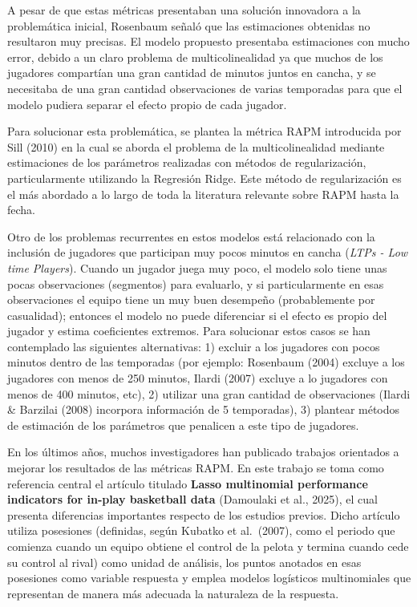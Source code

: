 \documentclass[
  12pt,
]{article}
\begin{document}
A pesar de que estas métricas presentaban una solución innovadora a la
problemática inicial, Rosenbaum señaló que las estimaciones obtenidas no
resultaron muy precisas. El modelo propuesto presentaba estimaciones con
mucho error, debido a un claro problema de multicolinealidad ya que
muchos de los jugadores compartían una gran cantidad de minutos juntos
en cancha, y se necesitaba de una gran cantidad observaciones de varias
temporadas para que el modelo pudiera separar el efecto propio de cada
jugador.

Para solucionar esta problemática, se plantea la métrica RAPM
introducida por Sill (2010) en la cual se aborda el problema de la
multicolinealidad mediante estimaciones de los parámetros realizadas con
métodos de regularización, particularmente utilizando la Regresión
Ridge. Este método de regularización es el más abordado a lo largo de
toda la literatura relevante sobre RAPM hasta la fecha.

Otro de los problemas recurrentes en estos modelos está relacionado con
la inclusión de jugadores que participan muy pocos minutos en cancha
(\emph{LTPs - Low time Players}). Cuando un jugador juega muy poco, el
modelo solo tiene unas pocas observaciones (segmentos) para evaluarlo, y
si particularmente en esas observaciones el equipo tiene un muy buen
desempeño (probablemente por casualidad); entonces el modelo no puede
diferenciar si el efecto es propio del jugador y estima coeficientes
extremos. Para solucionar estos casos se han contemplado las siguientes
alternativas: 1) excluir a los jugadores con pocos minutos dentro de las
temporadas (por ejemplo: Rosenbaum (2004) excluye a los jugadores con
menos de 250 minutos, Ilardi (2007) excluye a lo jugadores con menos de
400 minutos, etc), 2) utilizar una gran cantidad de observaciones
(Ilardi \& Barzilai (2008) incorpora información de 5 temporadas), 3)
plantear métodos de estimación de los parámetros que penalicen a este
tipo de jugadores.

En los últimos años, muchos investigadores han publicado trabajos
orientados a mejorar los resultados de las métricas RAPM. En este
trabajo se toma como referencia central el artículo titulado
\textbf{Lasso multinomial performance indicators for in‑play basketball
data} (Damoulaki et al., 2025), el cual presenta diferencias importantes
respecto de los estudios previos. Dicho artículo utiliza posesiones
(definidas, según Kubatko et al.~(2007), como el periodo que comienza
cuando un equipo obtiene el control de la pelota y termina cuando cede
su control al rival) como unidad de análisis, los puntos anotados en
esas posesiones como variable respuesta y emplea modelos logísticos
multinomiales que representan de manera más adecuada la naturaleza de la
respuesta.
\end{document}
